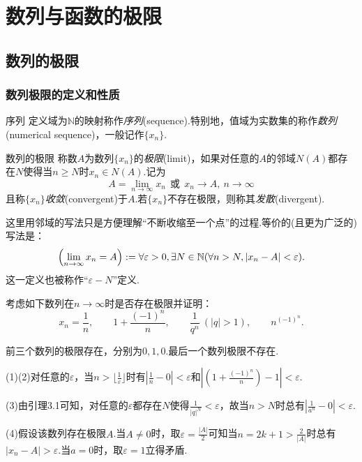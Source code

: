 \chapter{数列与函数的极限}

\section{数列的极限}

\subsection{数列极限的定义和性质}

\begin{definition}{序列}
	定义域为$\mathbb{N}$的映射称作\textit{序列}(sequence).特别地，值域为实数集的称作\textit{数列}(numerical sequence)，一般记作$\{ x_n \}$.
\end{definition}

\begin{definition}{数列的极限}
	称数$A$为数列$\{ x_n \}$的\textit{极限}(limit)，如果对任意的$A$的邻域$N(A)$都存在$N$使得当$n \geq N$时$x_n \in N(A)$.记为$$A = \lim_{n \to \infty} x_n ~~ \text{或} ~~ x_n \to A,~n \to \infty$$且称$\{ x_n \}$\textit{收敛}(convergent)于$A$.若$\{ x_n \}$不存在极限，则称其\textit{发散}(divergent).
\end{definition}
\begin{remark}
	这里用邻域的写法只是方便理解“不断收缩至一个点”的过程.等价的(且更为广泛的)写法是：$$\left( \lim_{n \to \infty} x_n = A \right) := \forall \varepsilon > 0 , \exists N \in \mathbb{N} (\forall n>N,|x_n-A|<\varepsilon ).$$
	这一定义也被称作“$\varepsilon -N$”定义.
\end{remark}

\begin{example}
	考虑如下数列在$n\to \infty$时是否存在极限并证明：$$x_n=\frac{1}{n},\qquad 1+\frac{(-1)^n}{n},\qquad \frac{1}{q^n}~(|q|>1),\qquad n^{(-1)^n}.$$
\end{example}
\begin{solution}
	前三个数列的极限存在，分别为$0,1,0$.最后一个数列极限不存在.
	
	(1)(2)对任意的$\varepsilon$，当$n>\lfloor \frac{1}{\varepsilon} \rfloor$时有$|\frac{1}{n} -0|<\varepsilon$和$|(1+\frac{(-1)^n}{n})-1|<\varepsilon$.
	
	(3)由引理3.1可知，对任意的$\varepsilon$都存在$N$使得$\frac{1}{|q|^N}<\varepsilon$，故当$n>N$时总有$|\frac{1}{a^n}-0|<\varepsilon$.
	
	(4)假设该数列存在极限$A$.当$A \neq 0$时，取$\varepsilon = \frac{|A|}{2}$可知当$n=2k+1 > \frac{2}{|A|}$时总有$|x_n-A|>\varepsilon$.当$a=0$时，取$\varepsilon =1$立得矛盾.
\end{solution}

